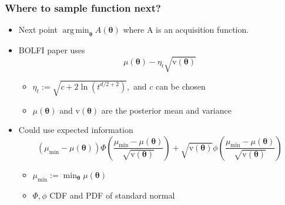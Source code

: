 \documentclass{beamer}
\DeclareMathOperator*{\argmin}{arg\,min}
\begin{document}
\begin{frame}
\end{frame}



\begin{frame}
    \frametitle{Where to sample function next?}
    \begin{itemize}
        \item Next point $\argmin_{\bm{\theta}}A(\bm\theta)$ where A is an acquisition function.
        \item <2-> BOLFI paper uses $$\mu(\bm\theta) - \eta_t\sqrt{\mathrm{v}(\bm\theta)}$$ \begin{itemize}
                  \item $\eta_t:= \sqrt{c + 2\ln(t^{d/2 + 2})},$ and $c$ can be chosen
                  \item $\mu(\bm\theta)$ and $\mathrm{v}(\bm\theta)$ are the posterior mean and variance
              \end{itemize}
        \item <3-> Could use expected information $$(\mu_\text{min} - \mu(\bm\theta))
                  \varPhi\left(\frac{\mu_\text{min} - \mu(\bm\theta)}{\sqrt{\mathrm{v}(\bm\theta)}}\right) + \sqrt{\mathrm{v}(\bm\theta)}
                  \phi\left(\frac{\mu_\text{min} - \mu(\bm\theta)}{\sqrt{\mathrm{v}(\bm\theta)}}\right)$$\begin{itemize}
                  \item $\mu_\text{min} := \min_{\bm{\theta}} \mu(\bm\theta)$
                  \item $\varPhi, \phi$ CDF and PDF of standard normal
              \end{itemize}
    \end{itemize}
\end{frame}
\end{document}
